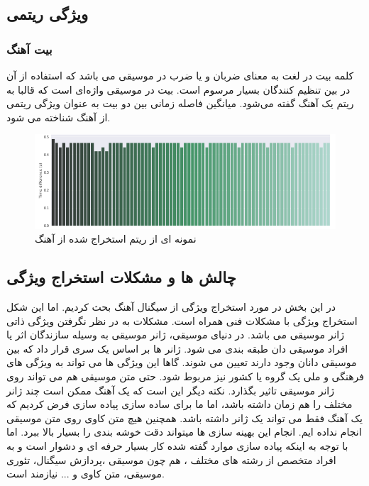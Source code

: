 \documentclass[conference]{IEEEtran}
\begin{document}
    \subsection{ ویژگی ریتمی   }
    \subsubsection{ بیت   آهنگ }
کلمه بیت در لغت به معنای ضربان و یا ضرب در موسیقی می باشد که استفاده از آن در بین تنظیم کنندگان بسیار مرسوم است. بیت در موسیقی واژه‌ای است که قالبا به ریتم یک آهنگ گفته می‌شود. میانگین فاصله زمانی بین دو بیت به عنوان ویژگی ریتمی از آهنگ شناخته می شود.
\begin{figure}[h!]
\includegraphics[width=\linewidth]{9.png}
      \caption{  نمونه ای از ریتم استخراج شده از آهنگ }
      \label{fig:fig 1}
    \end{figure}
        \subsection{ چالش ها و مشکلات استخراج ویژگی } 
در این بخش در مورد استخراج ویژگی از سیگنال آهنگ بحث کردیم. اما این شکل استخراج ویژگی با مشکلات فنی همراه است. مشکلات به در نظر نگرفتن ویژگی ذاتی ژانر موسیقی می باشد. در دنیای موسیقی، ژانر موسیقی به وسیله سازندگان اثر یا افراد موسیقی دان طبقه بندی می شود. ژانر ها بر اساس یک سری قرار داد که بین موسیقی دانان وجود دارند تعیین می شوند. گاها این ویژگی ها می تواند به ویژگی های فرهنگی و ملی یک گروه یا کشور نیز مربوط شود. حتی متن موسیقی هم می تواند روی ژانر موسیقی تاثیر بگذارد. نکته دیگر این است که یک آهنگ ممکن است چند ژانر مختلف را هم زمان داشته باشد، اما ما برای ساده سازی پیاده سازی فرض کردیم که یک آهنگ فقط می تواند یک ژانر داشته باشد. همچنین هیچ متن کاوی     روی متن موسیقی    انجام نداده ایم. 
انجام این بهینه سازی ها میتواند دقت خوشه بندی را بسیار بالا ببرد. اما با توجه به اینکه پیاده سازی موارد گفته شده کار بسیار حرفه ای و دشوار است و به افراد متخصص از رشته های مختلف ، هم چون موسیقی ،پردازش سیگنال، تئوری موسیقی، متن کاوی و ... نیازمند است.
\end{document}
